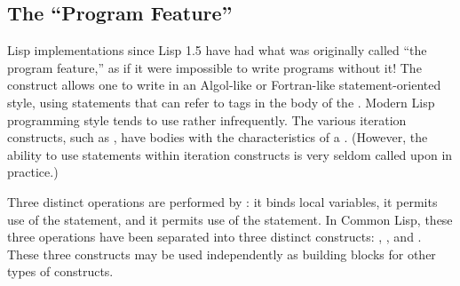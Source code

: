 \subsection{The ``Program Feature''}

Lisp implementations since Lisp 1.5 have had what was originally
called ``the program feature,'' as if it were impossible to write
programs without it!  The  construct allows one to
write in an Algol-like or Fortran-like statement-oriented
style, using  statements that can refer to tags in the
body of the .  Modern Lisp programming style tends to use
 rather infrequently.  The various iteration constructs,
such as , have bodies with the characteristics of a .
(However, the ability to use  statements within iteration
constructs is very seldom called upon in practice.)

Three distinct operations are performed by : it binds local variables,
it permits use of the  statement, and it permits use of the 
statement.
In Common Lisp, these three operations have been separated into three
distinct constructs: , , and .
These three constructs may be used independently as building blocks
for other types of constructs.


